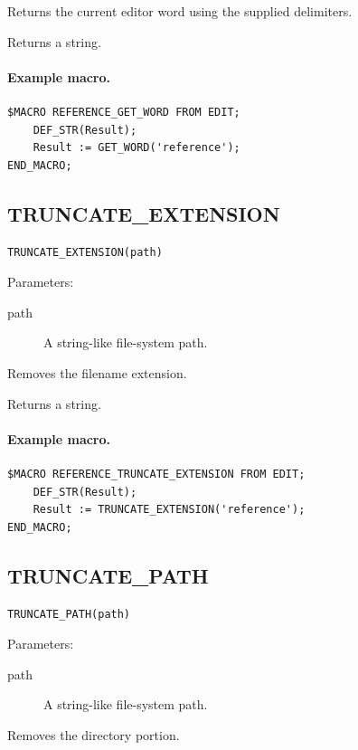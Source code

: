 \documentclass[a4paper,10pt,twoside,openany]{book}
\begin{document}
Returns the current editor word using the supplied delimiters.

Returns a string.

\paragraph{Example macro.}
\begin{verbatim}
$MACRO REFERENCE_GET_WORD FROM EDIT;
    DEF_STR(Result);
    Result := GET_WORD('reference');
END_MACRO;
\end{verbatim}

\label{prim:intrinsic-truncate-extension}
\subsection*{TRUNCATE\_EXTENSION}
\begin{verbatim}
TRUNCATE_EXTENSION(path)
\end{verbatim}
Parameters:
\begin{description}
\item[path] A string-like file-system path.
\end{description}

Removes the filename extension.

Returns a string.

\paragraph{Example macro.}
\begin{verbatim}
$MACRO REFERENCE_TRUNCATE_EXTENSION FROM EDIT;
    DEF_STR(Result);
    Result := TRUNCATE_EXTENSION('reference');
END_MACRO;
\end{verbatim}

\label{prim:intrinsic-truncate-path}
\subsection*{TRUNCATE\_PATH}
\begin{verbatim}
TRUNCATE_PATH(path)
\end{verbatim}
Parameters:
\begin{description}
\item[path] A string-like file-system path.
\end{description}

Removes the directory portion.
\end{document}
